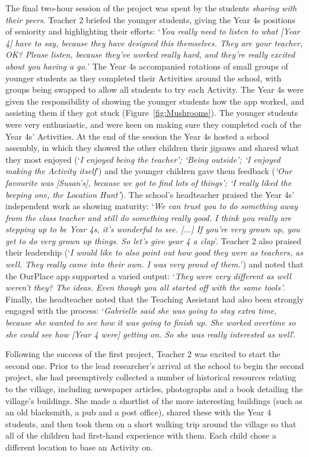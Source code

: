 \documentclass[,hyphens]{sigchi}
\begin{document}
The final two-hour session of the project was spent by the students \textit{sharing with their peers}. Teacher 2 briefed the younger students, giving the Year 4s positions of seniority and highlighting their efforts: `\textit{You really need to listen to what [Year 4] have to say, because they have designed this themselves. They are your teacher, OK? Please listen, because they've worked really hard, and they're really excited about you having a go.}' The Year 4s accompanied rotations of small groups of younger students as they completed their Activities around the school, with groups being swapped to allow all students to try each Activity. The Year 4s were given the responsibility of showing the younger students how the app worked, and assisting them if they got stuck (Figure~\ref{fig:Mushrooms}). The younger students were very enthusiastic, and were keen on making sure they completed each of the Year 4s' Activities. At the end of the session the Year 4s hosted a school assembly, in which they showed the other children their jigsaws and shared what they most enjoyed (`\textit{I enjoyed being the teacher'; `Being outside'; `I enjoyed making the Activity itself}') and the younger children gave them feedback (\textit{`Our favourite was [Susan's], because we got to find lots of things'; `I really liked the beeping one, the Location Hunt'}). The school's headteacher praised the Year 4s' independent work as showing maturity: `\textit{We can trust you to do something away from the class teacher and still do something really good. I think you really are stepping up to be Year 4s, it's wonderful to see. [...] If you're very grown up, you get to do very grown up things. So let's give year 4 a clap}'. Teacher 2 also praised their leadership (`\textit{I would like to also point out how good they were as teachers, as well. They really came into their own. I was very proud of them.}') and noted that the OurPlace app supported a varied output: `\textit{They were very different as well weren't they? The ideas. Even though you all started off with the same tools'}. Finally, the headteacher noted that the Teaching Assistant had also been strongly engaged with the process: `\textit{Gabrielle said she was going to stay extra time, because she wanted to see how it was going to finish up. She worked overtime so she could see how [Year 4 were] getting on. So she was really interested as well}'.

Following the success of the first project, Teacher 2 was excited to start the second one. Prior to the lead researcher's arrival at the school to begin the second project, she had preemptively collected a number of historical resources relating to the village, including newspaper articles, photographs and a book detailing the village's buildings. She made a shortlist of the more interesting buildings (such as an old blacksmith, a pub and a post office), shared these with the Year 4 students, and then took them on a short walking trip around the village so that all of the children had first-hand experience with them. Each child chose a different location to base an Activity on.
\end{document}

